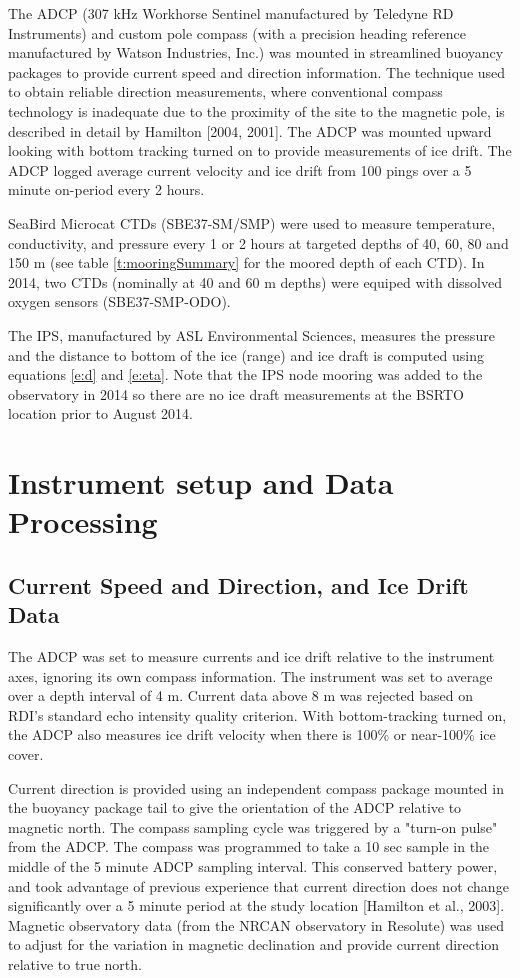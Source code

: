 \documentclass[12pt]{dforeport}
\begin{document}
The ADCP (307 kHz Workhorse Sentinel manufactured by Teledyne RD Instruments) and custom pole compass (with a precision heading reference manufactured by Watson Industries, Inc.) was mounted in streamlined buoyancy packages to provide current speed and direction information.  The technique used to obtain reliable direction measurements, where conventional compass technology is inadequate due to the proximity of the site to the magnetic pole, is described in detail by Hamilton [2004, 2001]. The ADCP was mounted upward looking with bottom tracking turned on to provide measurements of ice drift. The ADCP logged average current velocity and ice drift from 100 pings over a 5 minute on-period every 2 hours.

SeaBird Microcat CTDs (SBE37-SM/SMP) were used to measure temperature, conductivity, and pressure every 1 or 2 hours at targeted depths of 40, 60, 80 and 150 m (see table \ref{t:mooringSummary} for the moored depth of each CTD). In 2014, two CTDs (nominally at 40 and 60 m depths) were equiped with dissolved oxygen sensors (SBE37-SMP-ODO).

The IPS, manufactured by ASL Environmental Sciences, measures the pressure and the distance to bottom of the ice (range) and ice draft is computed using equations \ref{e:d} and \ref{e:eta}. Note that the IPS node mooring was added to the observatory in 2014 so there are no ice draft measurements at the BSRTO location prior to August 2014.

\section{Instrument setup and Data Processing}

\subsection{Current Speed and Direction, and Ice Drift Data}

The ADCP was set to measure currents and ice drift relative to the instrument axes, ignoring its own compass information.  The instrument was set to average over a depth interval of 4 m.  Current data above 8 m was rejected based on RDI's standard echo intensity quality criterion.  With bottom-tracking turned on, the ADCP also measures ice drift velocity when there is 100\% or near-100\% ice cover.

Current direction is provided using an independent compass package mounted in the buoyancy package tail to give the orientation of the ADCP relative to magnetic north.  The compass sampling cycle was triggered by a "turn-on pulse" from the ADCP.  The compass was programmed to take a 10 sec sample in the middle of the 5 minute ADCP sampling interval.  This conserved battery power, and took advantage of previous experience that current direction does not change significantly over a 5 minute period at the study location [Hamilton et al., 2003].  Magnetic observatory data (from the NRCAN observatory in Resolute) was used to adjust for the variation in magnetic declination and provide current direction relative to true north. 
\end{document}
